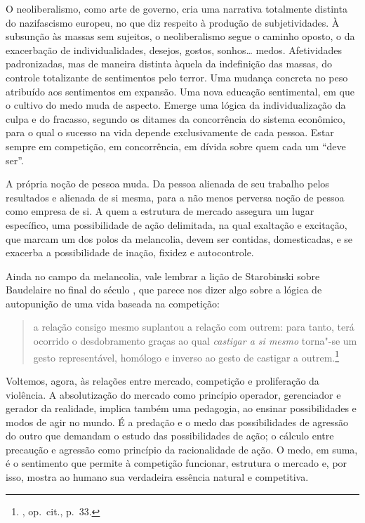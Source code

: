 \asterisc

O neoliberalismo, como arte de governo, cria uma narrativa totalmente
distinta do nazifascismo europeu, no que diz respeito à produção de
subjetividades. À subsunção às massas sem sujeitos, o neoliberalismo
segue o caminho oposto, o da exacerbação de individualidades, desejos,
gostos, sonhos\ldots{} medos. Afetividades padronizadas, mas de maneira
distinta àquela da indefinição das massas, do controle totalizante de
sentimentos pelo terror. Uma mudança concreta no peso atribuído aos
sentimentos em expansão. Uma nova educação sentimental, em que o cultivo
do medo muda de aspecto. Emerge uma lógica da individualização da culpa
e do fracasso, segundo os ditames da concorrência do sistema econômico,
para o qual o sucesso na vida depende exclusivamente de cada pessoa.
Estar sempre em competição, em concorrência, em dívida sobre quem cada
um ``deve ser''.

A própria noção de pessoa muda. Da pessoa alienada de seu trabalho pelos
resultados e alienada de si mesma, para a não menos perversa noção de
pessoa como empresa de si. A quem a estrutura de mercado assegura
um lugar específico, uma possibilidade de ação delimitada, na qual
exaltação e excitação, que marcam um dos polos da melancolia, devem ser
contidas, domesticadas, e se exacerba a possibilidade de inação, fixidez
e autocontrole.

Ainda no campo da melancolia, vale lembrar a lição de Starobinski sobre
Baudelaire no final do século , que parece nos dizer algo sobre a
lógica de autopunição de uma vida baseada na competição:

\begin{quote}
a relação
consigo mesmo suplantou a relação com outrem: para tanto, terá ocorrido
o desdobramento graças ao qual \emph{castigar a si mesmo} torna"-se um
gesto representável, homólogo e inverso ao gesto de castigar a
outrem.\footnote{, op.~cit., p.~33.}
\end{quote}

\asterisc

Voltemos, agora, às relações entre mercado, competição e proliferação da violência.
A absolutização do mercado como princípio operador, gerenciador e
gerador da realidade, implica também uma pedagogia, ao ensinar
possibilidades e modos de agir no mundo. É a predação e o medo das
possibilidades de agressão do outro que demandam o estudo das
possibilidades de ação; o cálculo entre precaução e agressão como
princípio da racionalidade de ação. O medo, em suma, é o sentimento que
permite à competição funcionar, estrutura o mercado e, por isso, mostra ao humano
sua verdadeira essência natural e competitiva.


